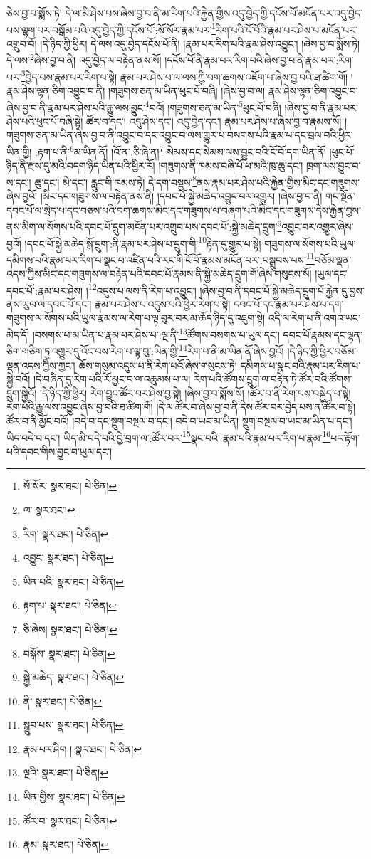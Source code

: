 ཅེས་བྱ་བ་སྨོས་ཏེ། དེ་ལ་མི་ཤེས་པས་ཞེས་བྱ་བ་ནི་མ་རིག་པའི་རྐྱེན་གྱིས་འདུ་བྱེད་ཀྱི་དངོས་པོ་མངོན་པར་འདུ་བྱེད་པས་ལྷག་པར་བསྒོམ་པའི་འདུ་བྱེད་ཀྱི་དངོས་པོ་:སོ་སོར་རྣམ་པར་\footnote{སོ་སོར་  སྣར་ཐང་།  པེ་ཅིན། }རིག་པའི་ངོ་བོའི་རྣམ་པར་ཤེས་པ་མངོན་པར་འགྲུབ་བོ། །དེ་ཉིད་ཀྱི་ཕྱིར། དེ་ལས་འདུ་བྱེད་དངོས་པོ་ནི། །རྣམ་པར་རིག་པའི་རྣམ་ཤེས་འབྱུང་། །ཞེས་བྱ་བ་སྨོས་ཏེ། དེ་ལས་\footnote{ལ་  སྣར་ཐང་། }ཞེས་བྱ་བ་ནི། འདུ་བྱེད་ལ་བརྟེན་ནས་སོ། །དངོས་པོ་ནི་རྣམ་པར་རིག་པའི་ཞེས་བྱ་བ་ནི་རྣམ་པར་:རིག་པར་\footnote{རིག་  སྣར་ཐང་།  པེ་ཅིན། }བྱེད་པས་རྣམ་པར་རིག་པ་སྟེ། རྣམ་པར་ཤེས་པ་ལ་ལས་ཀྱི་བག་ཆགས་འཇོག་པ་ཞེས་བྱ་བའི་ཐ་ཚིག་གོ། །རྣམ་ཤེས་ལྷན་ཅིག་འབྱུང་བ་ནི། །གཟུགས་ཅན་མ་ཡིན་ཕུང་པོ་བཞི། །ཞེས་བྱ་བ་ལ། རྣམ་ཤེས་ལྷན་ཅིག་འབྱུང་བ་ཞེས་བྱ་བ་ནི་རྣམ་པར་ཤེས་པའི་རྒྱུ་ལས་བྱུང་\footnote{འབྱུང་  སྣར་ཐང་།  པེ་ཅིན། }བའོ། །གཟུགས་ཅན་མ་ཡིན་\footnote{ཡིན་པའི་  སྣར་ཐང་།  པེ་ཅིན། }ཕུང་པོ་བཞི། །ཞེས་བྱ་བ་ནི་རྣམ་པར་ཤེས་པའི་ཕུང་པོ་བཞི་སྟེ། ཚོར་བ་དང་། འདུ་ཤེས་དང་། འདུ་བྱེད་དང་། རྣམ་པར་ཤེས་པ་ཞེས་བྱ་བ་རྣམས་སོ། །གཟུགས་ཅན་མ་ཡིན་ཞེས་བྱ་བ་ནི་འབྱུང་བ་དང་འབྱུང་བ་ལས་གྱུར་པ་བསགས་པའི་རྣམ་པ་དང་བྲལ་བའི་ཕྱིར་ཡིན་གྱི། :རྟག་པ་ནི་\footnote{རྟག་པ་  སྣར་ཐང་།  པེ་ཅིན། }མ་ཡིན་ནོ། །འོ་ན་:ཅི་ཞེ་ན།\footnote{ཅི་ཞེས།  སྣར་ཐང་།  པེ་ཅིན། } སེམས་དང་སེམས་ལས་བྱུང་བའི་ངོ་བོ་དག་ཡིན་ནོ། །ཕུང་པོ་ཉིད་ནི་རྫས་དུ་མའི་བདག་ཉིད་ཡིན་པའི་ཕྱིར་རོ། །གཟུགས་ནི་ཁམས་བཞི་པོ་ཕ་མའི་ཁུ་ཆུ་དང་། ཁྲག་ལས་བྱུང་བ་ས་དང་། ཆུ་དང་། མེ་དང་། རླུང་གི་ཁམས་ཏེ། དེ་དག་བསྡུས་\footnote{བསྒོས་  སྣར་ཐང་།  པེ་ཅིན། }ནས་རྣམ་པར་ཤེས་པའི་རྐྱེན་གྱིས་མིང་དང་གཟུགས་ཞེས་བྱའོ། །མིང་དང་གཟུགས་ལ་བརྟེན་ནས་ནི། །དབང་པོ་སྐྱེ་མཆེད་འབྱུང་བར་འགྱུར། །ཞེས་བྱ་བ་ནི། གང་སྔོན་དབང་པོ་ལ་སྲེད་པ་དང་བཅས་པའི་བག་ཆགས་མིང་དང་གཟུགས་ལ་བཞག་པའི་མིང་དང་གཟུགས་དེས་རྐྱེན་བྱས་ནས་མིག་ལ་སོགས་པའི་དབང་པོ་དྲུག་མངོན་པར་འགྲུབ་པས་དབང་པོ་:སྐྱེ་མཆེད་དྲུག་\footnote{སྐྱེ་མཆེད་  སྣར་ཐང་།  པེ་ཅིན། }འབྱུང་བར་འགྱུར་ཞེས་བྱའོ། །དབང་པོ་སྐྱེ་མཆེད་སྒོ་དྲུག་:ནི་རྣམ་པར་ཤེས་པ་དྲུག་གི་\footnote{ནི་  སྣར་ཐང་།  པེ་ཅིན། }རྟེན་དུ་གྱུར་པ་སྟེ། གཟུགས་ལ་སོགས་པའི་ཡུལ་དམིགས་པའི་རྣམ་པར་རིག་པ་སྣང་བ་འཛིན་པའི་རང་གི་ངོ་བོ་རྣམས་མངོན་པར་:བསྒྲུབས་པས་\footnote{སྒྲུབ་པས་  སྣར་ཐང་།  པེ་ཅིན། }བཅོམ་ལྡན་འདས་ཀྱིས་མིང་དང་གཟུགས་ལ་བརྟེན་པའི་དབང་པོ་རྣམས་ནི་སྐྱེ་མཆེད་དྲུག་གོ་ཞེས་གསུངས་སོ། །ཡུལ་དང་དབང་པོ་:རྣམ་པར་ཤེས། །\footnote{རྣམ་པར་ཤིག །  སྣར་ཐང་།  པེ་ཅིན། }འདུས་པ་ལས་ནི་རེག་པ་འབྱུང་། །ཞེས་བྱ་བ་ནི་དབང་པོ་སྐྱེ་མཆེད་དྲུག་པོ་རྐྱེན་དུ་བྱས་ནས་ཡུལ་ལ་དབང་པོ་དང་། རྣམ་པར་ཤེས་པ་འདུས་པའི་ཕྱིར་རེག་པ་སྟེ། དབང་པོ་དང་རྣམ་པར་ཤེས་པ་དག་གཟུགས་ལ་སོགས་པའི་ཡུལ་རྣམས་ལ་རེག་པ་ལྟ་བུར་བར་མ་ཆོད་ཉིད་དུ་འཇུག་སྟེ། འདི་ལ་རེག་པ་ནི་འགའ་ཡང་མེད་དོ། །བསགས་པ་མ་ཡིན་པ་རྣམ་པར་ཤེས་པ་:ལྔ་ནི་\footnote{ལྔའི་  སྣར་ཐང་།  པེ་ཅིན། }ཚོགས་བསགས་པ་ཡུལ་དང་། དབང་པོ་རྣམས་དང་ལྷན་ཅིག་གཅིག་ཏུ་འགྱུར་དུ་འོང་བས་རེག་པ་ལྟ་བུ་:ཡིན་གྱི་\footnote{ཡིན་གྱིས་  སྣར་ཐང་།  པེ་ཅིན། }རེག་པ་ནི་མ་ཡིན་ནོ་ཞེས་བྱའོ། །དེ་ཉིད་ཀྱི་ཕྱིར་བཅོམ་ལྡན་འདས་ཀྱིས་ཀྱང་། ཆོས་གསུམ་འདུས་པ་ནི་རེག་པའོ་ཞེས་གསུངས་ཏེ། དམིགས་པ་སྣང་བའི་རྣམ་པར་རིག་པ་སྐྱེ་བའོ། །དེ་བཞིན་དུ་རེག་པའི་རོ་མྱང་བ་ལ་འཆུམས་པ་ལ། རེག་པའི་ཚོགས་དྲུག་ལ་བརྟེན་ཏེ་ཚོར་བའི་ཚོགས་དྲུག་སྐྱེའོ། །དེ་ཉིད་ཀྱི་ཕྱིར། རེག་བྱུང་ཚོར་བར་ཤེས་བྱ་སྟེ། །ཞེས་བྱ་བ་སྨོས་སོ། །ཚོར་བ་ནི་རེག་པས་བསྐྱེད་པ་སྟེ། རེག་པའི་རྒྱུ་ལས་འབྱུང་ཞེས་བྱ་བའི་ཐ་ཚིག་གོ། །དེ་ལ་ཚོར་བ་ཞེས་བྱ་བ་ནི་དེས་ཚོར་བར་བྱེད་པས་ན་ཚོར་བ་སྟེ། ཚོར་བ་ནི་མྱོང་བའོ། །བདེ་བ་དང་སྡུག་བསྔལ་བ་དང་། བདེ་བ་ཡང་མ་ཡིན། སྡུག་བསྔལ་བ་ཡང་མ་ཡིན་པ་དང་། ཡིད་བདེ་བ་དང་། ཡིད་མི་བདེ་བའི་བྱེ་བྲག་ལ་:ཚོར་བར་\footnote{ཚོར་བ་  སྣར་ཐང་།  པེ་ཅིན། }སྣང་བའི་:རྣམ་པའི་རྣམ་པར་རིག་པ་རྣམ་\footnote{རྣམ་  སྣར་ཐང་།  པེ་ཅིན། }པར་རྟོག་པའི་དབང་གིས་བྱུང་བ་ཡུལ་དང་། 